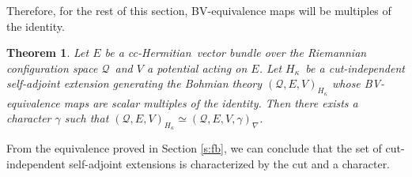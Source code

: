 \documentclass[11pt]{article}
\newtheorem{theorem}{Theorem}
\theoremstyle{remark}
\begin{document}
Therefore, for the rest of this section, BV-equivalence
maps will be multiples of the identity. 

\begin{theorem}
Let $E$ be a cc-Hermitian\ vector bundle over the Riemannian configuration
space \ensuremath{\mathcal{Q}}\ and $V$ a potential acting on $E$. 
Let \ensuremath{H_{\ensuremath{\kappa}}}\ be a cut-independent self-adjoint extension 
generating the Bohmian theory $(\ensuremath{\mathcal{Q}}, E, V)_{\ensuremath{H_{\ensuremath{\kappa}}}}$ whose
BV-equivalence maps are scalar multiples of the identity. Then there
exists a character $\ensuremath{\gamma}$ such that 
 $(\ensuremath{\mathcal{Q}}, E, V)_{\ensuremath{H_{\ensuremath{\kappa}}}} \ensuremath{\simeq} (\ensuremath{\mathcal{Q}}, E, V, \ensuremath{\gamma})_{\nabla}$.
\end{theorem}

From the equivalence proved in Section {\ref{s:fb}}, we can conclude that
the set of cut-independent self-adjoint extensions is characterized by
the cut and a character. 
\end{document}
